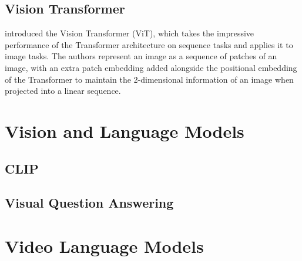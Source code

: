 \subsection{Vision Transformer}
\label{ssec:vit}

\cite{dosovitskiy2021vit} introduced the Vision Transformer (ViT), which takes the impressive performance of the Transformer architecture on sequence tasks and applies it to image tasks. The authors represent an image as a sequence of patches of an image, with an extra patch embedding added alongside the positional embedding of the Transformer \cite{vaswani2017attention} to maintain the 2-dimensional information of an image when projected into a linear sequence. 

\section{Vision and Language Models}
\label{sec:vlm}

\subsection{CLIP}
\label{ssec:clip}

\subsection{Visual Question Answering}
\label{ssec:vqa}

\section{Video Language Models}
\label{sec:vidlm}

%
%
%
%
